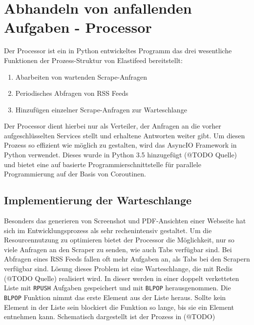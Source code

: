\section{Abhandeln von anfallenden Aufgaben - Processor}

Der Processor ist ein in Python entwickeltes Programm das drei wesentliche Funktionen der Prozess-Struktur von Elastifeed bereitstellt:
\begin{enumerate}
        \item Abarbeiten von wartenden Scrape-Anfragen
        \item Periodisches Abfragen von RSS Feeds
        \item Hinzufügen einzelner Scrape-Anfragen zur Warteschlange
\end{enumerate}
Der Processor dient hierbei nur als Verteiler, der Anfragen an die vorher aufgeschlüsselten Services stellt und erhaltene Antworten weiter gibt.
Um diesen Prozess so effizient wie möglich zu gestalten, wird das AsyncIO Framework in Python verwendet.
Dieses wurde in Python 3.5 hinzugefügt (@TODO Quelle) und bietet eine auf  basierte Programmierschnittstelle für parallele Programmierung auf der Basis von Coroutinen.

\subsection{Implementierung der Warteschlange}
Besonders das generieren von Screenshot und PDF-Ansichten einer Webseite hat sich im Entwicklungsprozess als sehr rechenintensiv gestaltet.
Um die Resourcennutzung zu optimieren bietet der Processor die Möglichkeit, nur so viele Anfragen an den Scraper zu senden, wie auch Tabs verfügbar sind.
Bei Abfragen eines RSS Feeds fallen oft mehr Aufgaben an, als Tabs bei den Scrapern verfügbar sind.
Lösung dieses Problem ist eine Warteschlange, die mit Redis (@TODO Quelle) realisiert wird.
In dieser werden in einer doppelt verketteten Liste mit \texttt{RPUSH} Aufgaben gespeichert und mit \texttt{BLPOP} herausgenommen.
Die \texttt{BLPOP} Funktion nimmt das erste Element aus der Liste heraus.
Sollte kein Element in der Liste sein blockiert die Funktion so lange, bis sie ein Element entnehmen kann.
Schematisch dargestellt ist der Prozess in (@TODO)
\endsubsection

